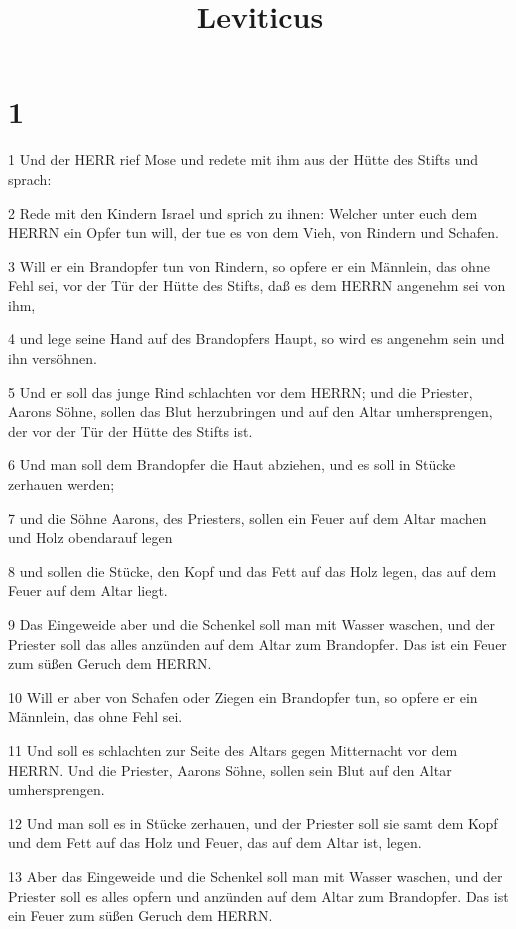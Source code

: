 

\title{Leviticus}


\chapter{1}

\par 1 Und der HERR rief Mose und redete mit ihm aus der Hütte des Stifts und sprach:
\par 2 Rede mit den Kindern Israel und sprich zu ihnen: Welcher unter euch dem HERRN ein Opfer tun will, der tue es von dem Vieh, von Rindern und Schafen.
\par 3 Will er ein Brandopfer tun von Rindern, so opfere er ein Männlein, das ohne Fehl sei, vor der Tür der Hütte des Stifts, daß es dem HERRN angenehm sei von ihm,
\par 4 und lege seine Hand auf des Brandopfers Haupt, so wird es angenehm sein und ihn versöhnen.
\par 5 Und er soll das junge Rind schlachten vor dem HERRN; und die Priester, Aarons Söhne, sollen das Blut herzubringen und auf den Altar umhersprengen, der vor der Tür der Hütte des Stifts ist.
\par 6 Und man soll dem Brandopfer die Haut abziehen, und es soll in Stücke zerhauen werden;
\par 7 und die Söhne Aarons, des Priesters, sollen ein Feuer auf dem Altar machen und Holz obendarauf legen
\par 8 und sollen die Stücke, den Kopf und das Fett auf das Holz legen, das auf dem Feuer auf dem Altar liegt.
\par 9 Das Eingeweide aber und die Schenkel soll man mit Wasser waschen, und der Priester soll das alles anzünden auf dem Altar zum Brandopfer. Das ist ein Feuer zum süßen Geruch dem HERRN.
\par 10 Will er aber von Schafen oder Ziegen ein Brandopfer tun, so opfere er ein Männlein, das ohne Fehl sei.
\par 11 Und soll es schlachten zur Seite des Altars gegen Mitternacht vor dem HERRN. Und die Priester, Aarons Söhne, sollen sein Blut auf den Altar umhersprengen.
\par 12 Und man soll es in Stücke zerhauen, und der Priester soll sie samt dem Kopf und dem Fett auf das Holz und Feuer, das auf dem Altar ist, legen.
\par 13 Aber das Eingeweide und die Schenkel soll man mit Wasser waschen, und der Priester soll es alles opfern und anzünden auf dem Altar zum Brandopfer. Das ist ein Feuer zum süßen Geruch dem HERRN.
